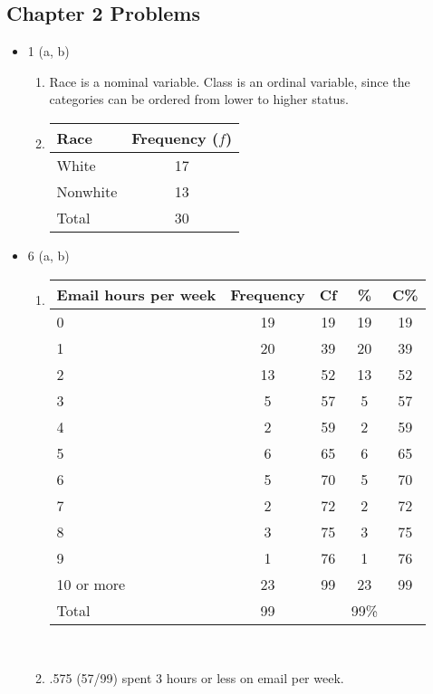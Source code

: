 \documentclass{article}
\begin{document}
\subsection*{Chapter 2 Problems}
\begin{itemize}
\item 1 (a, b) 
	\begin{enumerate}[label=(\alph*)]
	\item Race is a nominal variable. Class is an ordinal variable, since the categories can be ordered from lower to higher status. 
	\item \begin{tabular}{ | l | c | }
	\hline
    	Race & Frequency ($f$)  \\ \hline
    	White & 17  \\ \hline
	Nonwhite & 13  \\ \hline
    	Total & 30  \\ 
	\hline
	\end{tabular}
	\end{enumerate}
\item 6 (a, b) 
	\begin{enumerate}[label=(\alph*)]
	\item \begin{tabular}{ | l | c | c | c | c | }
	\hline
	Email hours per week & Frequency & Cf & \% & C\%  \\ \hline
	0 & 19 & 19 & 19 & 19 \\ \hline
	1 & 20 & 39 & 20 & 39 \\ \hline
	2 & 13 & 52 & 13 & 52 \\ \hline
	3 & 5 & 57 & 5 & 57 \\ \hline
	4 & 2 & 59 & 2 & 59 \\ \hline
	5 & 6 & 65 & 6 & 65 \\ \hline
	6 & 5 & 70 & 5 & 70 \\ \hline
	7 & 2 & 72 & 2 & 72 \\ \hline
	8 & 3 & 75 & 3 & 75 \\ \hline
	9 & 1 & 76 & 1 & 76 \\ \hline
	10 or more  & 23 & 99 & 23 & 99 \\ \hline
	Total  & 99 &  &  99\% & \\
	\hline 
	\end{tabular} \\
	\item .575 (57/99) spent 3 hours or less on email per week.
	\end{enumerate}
\end{itemize}
\end{document}
